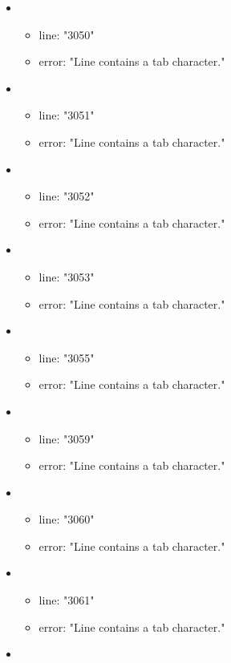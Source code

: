 \begin{itemize}
\begin{itemize}
	\end{itemize}
	\item 
	\begin{itemize} 
		\item line: "3050" 
		\item error: "Line contains a tab character." 
	\end{itemize}
	\item 
	\begin{itemize} 
		\item line: "3051" 
		\item error: "Line contains a tab character." 
	\end{itemize}
	\item 
	\begin{itemize} 
		\item line: "3052" 
		\item error: "Line contains a tab character." 
	\end{itemize}
	\item 
	\begin{itemize} 
		\item line: "3053" 
		\item error: "Line contains a tab character." 
	\end{itemize}
	\item 
	\begin{itemize} 
		\item line: "3055" 
		\item error: "Line contains a tab character." 
	\end{itemize}
	\item 
	\begin{itemize} 
		\item line: "3059" 
		\item error: "Line contains a tab character." 
	\end{itemize}
	\item 
	\begin{itemize} 
		\item line: "3060" 
		\item error: "Line contains a tab character." 
	\end{itemize}
	\item 
	\begin{itemize} 
		\item line: "3061" 
		\item error: "Line contains a tab character." 
	\end{itemize}
	\item 
	\begin{itemize} 

\end{itemize}
\end{itemize}
